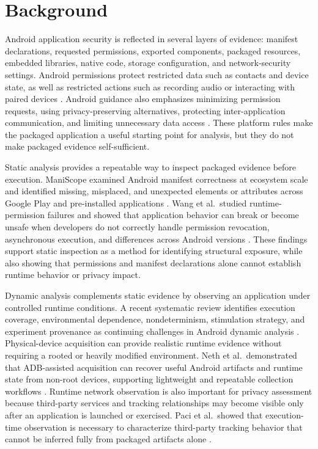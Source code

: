 \section{Background}

Android application security is reflected in several layers of evidence: manifest declarations, requested permissions, exported components, packaged resources, embedded libraries, native code, storage configuration, and network-security settings. Android permissions protect restricted data such as contacts and device state, as well as restricted actions such as recording audio or interacting with paired devices \cite{androidPermissions2026}. Android guidance also emphasizes minimizing permission requests, using privacy-preserving alternatives, protecting inter-application communication, and limiting unnecessary data access \cite{androidPrivacyChecklist2026,androidSecurityBestPractices2026}. These platform rules make the packaged application a useful starting point for analysis, but they do not make packaged evidence self-sufficient.

Static analysis provides a repeatable way to inspect packaged evidence before execution. ManiScope examined Android manifest correctness at ecosystem scale and identified missing, misplaced, and unexpected elements or attributes across Google Play and pre-installed applications \cite{yang2022maniscope}. Wang et al.\ studied runtime-permission failures and showed that application behavior can break or become unsafe when developers do not correctly handle permission revocation, asynchronous execution, and differences across Android versions \cite{wang2023runtimepermissions}. These findings support static inspection as a method for identifying structural exposure, while also showing that permissions and manifest declarations alone cannot establish runtime behavior or privacy impact.

Dynamic analysis complements static evidence by observing an application under controlled runtime conditions. A recent systematic review identifies execution coverage, environmental dependence, nondeterminism, stimulation strategy, and experiment provenance as continuing challenges in Android dynamic analysis \cite{sutter2024dynamic}. Physical-device acquisition can provide realistic runtime evidence without requiring a rooted or heavily modified environment. Neth et al.\ demonstrated that ADB-assisted acquisition can recover useful Android artifacts and runtime state from non-root devices, supporting lightweight and repeatable collection workflows \cite{neth2023androidtriage}. Runtime network observation is also important for privacy assessment because third-party services and tracking relationships may become visible only after an application is launched or exercised. Paci et al.\ showed that execution-time observation is necessary to characterize third-party tracking behavior that cannot be inferred fully from packaged artifacts alone \cite{paci2023tracking}.

